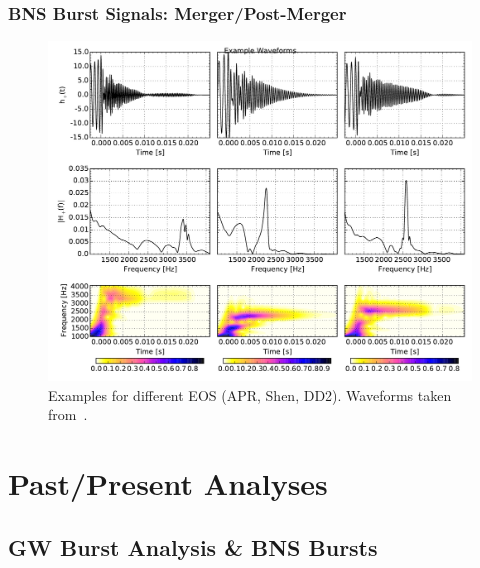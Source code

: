 \documentclass[serif,mathserif,10pt]{beamer}
\let\oldframetitle\frametitle%
\renewcommand{\frametitle}[1]{%
      \oldframetitle{#1}\setstretch{1.2}}
\begin{document}
\begin{frame}
\begin{columns}
    \end{columns}

\end{frame}

\begin{frame}
    \frametitle{BNS Burst Signals: Merger/Post-Merger}
    \begin{figure}
        \centering
        \includegraphics[width=0.75\columnwidth]{figures/example_waves.pdf}
        \caption{Examples for different EOS (APR, Shen, DD2).  Waveforms taken
        from~\cite{2014PhRvD..90f2004C}.}
    \end{figure}
\end{frame}

\section{Past/Present Analyses}

\subsection{GW Burst Analysis \& BNS Bursts}
\end{document}
